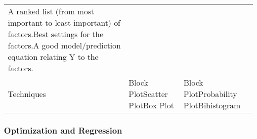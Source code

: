 \documentclass[]{book}
\theoremstyle{definition}
\theoremstyle{definition}
\theoremstyle{definition}
\theoremstyle{remark}
\begin{document}
\begin{longtable}[]{@{}lll@{}}
\begin{minipage}[t]{0.39\columnwidth}
A ranked list (from most important to least important) of factors.Best
settings for the factors.A good model/prediction equation relating Y to
the factors.\strut
\end{minipage}\tabularnewline
\begin{minipage}[t]{0.14\columnwidth}\raggedright\strut
Techniques\strut
\end{minipage} & \begin{minipage}[t]{0.39\columnwidth}\raggedright\strut
Block PlotScatter PlotBox Plot\strut
\end{minipage} & \begin{minipage}[t]{0.39\columnwidth}\raggedright\strut
Block PlotProbability PlotBihistogram\strut
\end{minipage}\tabularnewline
\bottomrule
\end{longtable}

\subsubsection{Optimization and
Regression}\label{optimization-and-regression}
\end{document}
